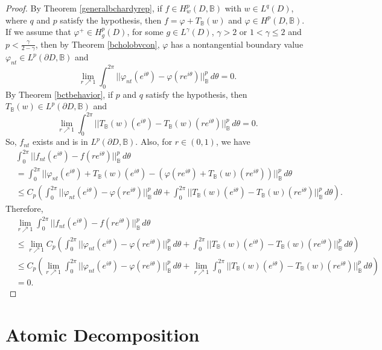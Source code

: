 \documentclass[suppldata]{interact}
\theoremstyle{plain}%
\theoremstyle{definition}
\theoremstyle{remark}
\newcommand{\p}{\partial}
\newcommand{\bc}{\mathbb{B}}
\begin{document}
\begin{proof}
By Theorem \ref{generalbchardyrep}, if $f \in H^p_{w}(D,\bc)$ with $w \in L^q(D)$, where $q$ and $p$ satisfy the hypothesis, then $f = \varphi + T_\bc(w)$ and $\varphi \in H^p(D,\bc)$. If we assume that $\varphi^+ \in H^p_g(D)$, for some $g \in L^\gamma(D)$, $\gamma>2$ or $1 < \gamma \leq 2$ and $p < \frac{\gamma}{2-\gamma}$, then by Theorem \ref{bcholobvcon}, $\varphi$ has a nontangential boundary value $\varphi_{nt} \in L^p(\p D,\bc)$ and 
\[
        \lim_{r \nearrow 1} \int_0^{2\pi} ||\varphi_{nt}(e^{i\theta}) - \varphi(re^{i\theta}) ||^p_{\bc} \, d\theta  = 0. 
    \]
By Theorem \ref{bctbehavior}, if $p$ and $q$ satisfy the hypothesis, then $T_\bc(w) \in L^p(\p D,\bc)$ and 
\[
\lim_{r \nearrow 1} \int_0^{2\pi} ||T_\bc(w)(e^{i\theta}) - T_\bc(w)(re^{i\theta}) ||^p_{\bc} \, d\theta  = 0.
\]
So, $f_{nt}$ exists and is in $L^p(\p D,\bc)$. Also, for $r \in (0,1)$, we have
\begin{align*}
    &\int_0^{2\pi} ||f_{nt}(e^{i\theta}) - f(re^{i\theta}) ||^p_{\bc} \, d\theta \\
    &= \int_0^{2\pi} ||\varphi_{nt}(e^{i\theta}) + T_\bc(w)(e^{i\theta}) - (\varphi(re^{i\theta}) + T_\bc(w)(re^{i\theta})) ||^p_{\bc} \, d\theta \\
    &\leq C_p \left( \int_0^{2\pi} ||\varphi_{nt}(e^{i\theta}) - \varphi(re^{i\theta})||_\bc^p\,d\theta  + \int_0^{2\pi} || T_\bc(w)(e^{i\theta}) - T_\bc(w)(re^{i\theta}) ||^p_{\bc} \, d\theta\right) .
\end{align*}
Therefore, 
\begin{align*}
& \lim_{r \nearrow 1} \int_0^{2\pi} ||f_{nt}(e^{i\theta}) - f(re^{i\theta}) ||^p_{\bc} \, d\theta \\
&\leq \lim_{r \nearrow 1} C_p \left( \int_0^{2\pi} ||\varphi_{nt}(e^{i\theta}) - \varphi(re^{i\theta})||_\bc^p\,d\theta  + \int_0^{2\pi} || T_\bc(w)(e^{i\theta}) - T_\bc(w)(re^{i\theta}) ||^p_{\bc} \, d\theta\right)\\
&\leq  C_p \left( \lim_{r \nearrow 1}\int_0^{2\pi} ||\varphi_{nt}(e^{i\theta}) - \varphi(re^{i\theta})||_\bc^p\,d\theta  + \lim_{r \nearrow 1}\int_0^{2\pi} || T_\bc(w)(e^{i\theta}) - T_\bc(w)(re^{i\theta}) ||^p_{\bc} \, d\theta\right)\\
&= 0.
\end{align*}

\end{proof}

\section{Atomic Decomposition}\label{atomicdecompsection}
\end{document}
